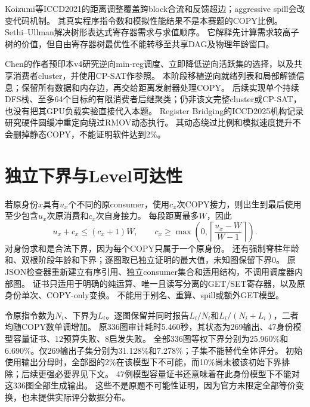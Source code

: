 \documentclass[UTF8,11pt,a4paper]{ctexart}
\begin{document}
Koizumi等ICCD2021\cite{koizumi}的距离调整覆盖跨block合流和反馈超边；aggressive spill会改变代码机制。
其真实程序指令数和模拟性能结果不是本赛题的COPY比例。
Sethi--Ullman\cite{sethi}解决树形表达式寄存器需求与求值顺序。
它解释先计算需求较高子树的价值，但自由寄存器树最优性不能转移至共享DAG及物理年龄窗口。

Chen的作者预印本v4\cite{chen}研究逆向min-reg调度、立即降低逆向活跃集的选择，以及共享消费者cluster，并使用CP-SAT作参照。
本阶段移植逆向就绪列表和局部解锁信息；保留所有数据和内存边，再交给距离发射器处理COPY。
后续实现单个持续DFS栈、至多64个目标的有限消费者后继聚类；仍非该文完整cluster或CP-SAT，
也没有把其GPU负载实验直接代入本题。
Register Bridging的ICCD2025机构记录\cite{bridge}研究硬件圆缓冲重定向绕过RMOV动态执行。
其动态绕过比例和模拟速度提升不会删掉静态COPY，不能证明软件达到2\%。

\section{独立下界与Level可达性}
若原身份$x$具有$u_x$个不同的原consumer，使用$c_x$次COPY接力，则出生到最后使用至少包含$u_x$次原消费和$c_x$次自身接力。
每段距离最多$W$，因此
\[
 u_x+c_x\le(c_x+1)W,\qquad
 c_x\ge\max\left(0,\left\lceil\frac{u_x-W}{W-1}\right\rceil\right).
\]
对身份求和是合法下界，因为每个COPY只属于一个原身份。
还有强制脊柱年龄和、双根阶段年龄和下界；逐图取已独立证明的最大值，未知图保留下界0。
原JSON检查器重新建立有序引用、独立consumer集合和适用结构，不调用调度器内部图。
证书只适用于明确的纯运算、唯一且读写分离的GET/SET寄存器，以及原身份单次、COPY-only变换。
不能用于别名、重算、spill或额外GET模型。

令原指令数为$N_i$、下界为$L_i$。逐图保留并同时报告$L_i/N_i$和$L_i/(N_i+L_i)$，二者均随COPY数单调增加。
原336图审计耗时5.460秒，其状态为269输出、47身份模型容量证书、12预算失败、8启发失败。
全部336图等权下界分别为25.960\%和6.690\%。仅269输出子集分别为31.128\%和7.278\%；子集不能替代全体评分。
初始使用输出分母时，全部图的2\%在该模型下不可能，而10\%尚未被该初始下界排除；后续更强必要界见下文。
47例模型容量证书还意味着在此身份模型下不能对这336图全部生成输出。
这些不是原题不可能性证明，因为官方未限定全部等价变换，也未提供实际评分数据分布。
\end{document}
